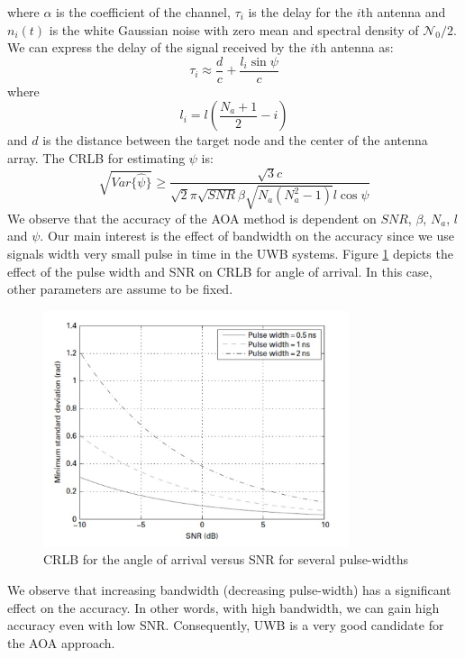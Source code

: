 \documentclass[\main/main.tex]{subfiles}
\begin{document}
where $\alpha$ is the coefficient of the channel, $\tau_i$ is the delay for the $i$th antenna and $n_i(t)$ is the white Gaussian noise with zero mean and spectral density of $\mathcal{N}_0/2$. We can express the delay of the signal received by the $i$th antenna as:
\begin{equation}
    \tau_i \approx \frac{d}{c} + \frac{l_i \sin{\psi}}{c}
\end{equation}
where
\begin{equation}
    l_i = l \left( \frac{N_a+1}{2} - i \right)
\end{equation}
and $d$ is the distance between the target node and the center of the antenna array. The CRLB for estimating $\psi$ is:
\begin{equation}
    \sqrt{Var\{\hat{\psi}\}} \geq \frac{\sqrt{3}c}{\sqrt{2}\pi\sqrt{SNR}\beta\sqrt{N_a(N_a^2-1)}l\cos{\psi}}
\end{equation}
We observe that the accuracy of the AOA method is dependent on $SNR$, $\beta$, $N_a$, $l$ and $\psi$. Our main interest is the effect of bandwidth on the accuracy since we use signals width very small pulse in time in the UWB systems. Figure \ref{fig:aoa_crlb_ for_angle_of_arrival_versus_snr} depicts the effect of the pulse width and SNR on CRLB for angle of arrival. In this case, other parameters are assume to be fixed.

\begin{figure}[!htbp]
    \centering
    \includegraphics[width=0.8\textwidth]{aoa_crlb_for_angle_of_arrival_versus_snr}
    \caption{CRLB for the angle of arrival versus SNR for several pulse-widths}
    \label{fig:aoa_crlb_ for_angle_of_arrival_versus_snr}
\end{figure}
We observe that increasing bandwidth (decreasing pulse-width) has a significant effect on the accuracy. In other words, with high bandwidth, we can gain high accuracy even with low SNR. Consequently, UWB is a very good candidate for the AOA approach.
\end{document}
